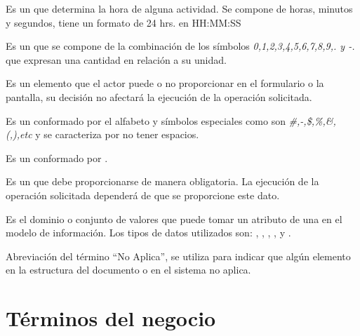 \begin{description}
	 Es un  que determina la hora de alguna actividad. Se compone de horas, minutos y segundos, tiene un formato de 24 hrs. en  HH:MM:SS 
	
	 Es un  que se compone de la combinación de los símbolos \textit{0,1,2,3,4,5,6,7,8,9,. y -.}  que expresan una cantidad en relación a su unidad.
	
	 Es un elemento que el actor puede o no proporcionar en el formulario o la pantalla, su decisión no afectará la ejecución de la operación solicitada.
	
	 Es un   conformado por el alfabeto y símbolos especiales como son \textit{\#,-,\$,\%,\&,(,),etc} y se caracteriza por no tener espacios.
	
	 Es un  conformado por .
	
	 Es un  que debe proporcionarse de manera obligatoria. La ejecución de la operación solicitada dependerá de que se proporcione este dato.
	
	
	 Es el dominio o conjunto de valores que puede tomar un atributo de una  en el modelo de información. Los tipos de datos utilizados son: , , , ,  y .
	
	 Abreviación del término ``No Aplica'', se utiliza para indicar que algún elemento en la estructura del documento o en el sistema no aplica.

\end{description}

\section{Términos del negocio}\label{sec:terminosNegocio}

